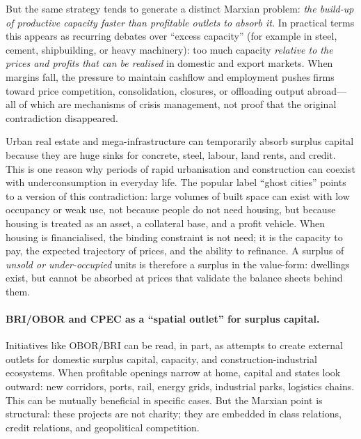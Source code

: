 But the same strategy tends to generate a distinct Marxian problem:
\emph{the build-up of productive capacity faster than profitable outlets to absorb it.}
In practical terms this appears as recurring debates over “excess capacity” (for example in
steel, cement, shipbuilding, or heavy machinery): too much capacity \emph{relative to the
prices and profits that can be realised} in domestic and export markets.\cite{OECDSteel}
When margins fall, the pressure to maintain cashflow and employment pushes firms toward
price competition, consolidation, closures, or offloading output abroad---all of which are
mechanisms of crisis management, not proof that the original contradiction disappeared.

Urban real estate and mega-infrastructure can temporarily absorb surplus capital because
they are huge sinks for concrete, steel, labour, land rents, and credit.
This is one reason why periods of rapid urbanisation and construction can coexist with
underconsumption in everyday life.
The popular label “ghost cities” points to a version of this contradiction:
large volumes of built space can exist with low occupancy or weak use,
not because people do not need housing, but because housing is treated as an asset,
a collateral base, and a profit vehicle.
When housing is financialised, the binding constraint is not need; it is the capacity to pay,
the expected trajectory of prices, and the ability to refinance.
A surplus of \emph{unsold or under-occupied} units is therefore a surplus in the value-form:
dwellings exist, but cannot be absorbed at prices that validate the balance sheets behind them.

\paragraph{BRI/OBOR and CPEC as a “spatial outlet” for surplus capital.}
Initiatives like OBOR/BRI can be read, in part, as attempts to create external outlets for
domestic surplus capital, capacity, and construction-industrial ecosystems.
When profitable openings narrow at home, capital and states look outward:
new corridors, ports, rail, energy grids, industrial parks, logistics chains.\cite{CarmodyTaylorZajontz2021}
This can be mutually beneficial in specific cases.
But the Marxian point is structural:
these projects are not charity; they are embedded in class relations, credit relations, and
geopolitical competition.


